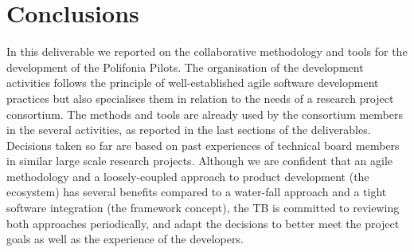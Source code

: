 \chapter{Conclusions}
In this deliverable we reported on the collaborative methodology and tools for the development of the Polifonia Pilots.
The organisation of the development activities follows the principle of well-established agile software development practices but also specialises them in relation to the needs of a research project consortium.
The methods and tools are already used by the consortium members in the several activities, as reported in the last sections of the deliverables.
Decisions taken so far are based on past experiences of technical board members in similar large scale research projects.
Although we are confident that an agile methodology and a loosely-coupled approach to product development (the ecosystem) has several benefits compared to a water-fall approach and a tight software integration (the framework concept), the TB is committed to reviewing both approaches periodically, and adapt the decisions to better meet the project goals as well as the experience of the developers.